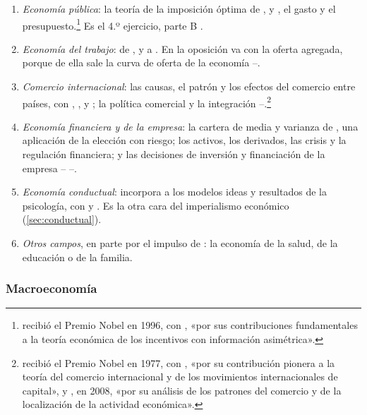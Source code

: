 \documentclass[11pt]{article}
\begin{document}
\begin{itemize}
\begin{enumerate}
  \item \emph{Economía pública}: la teoría de la imposición óptima de ,  y , el gasto y el presupuesto.\footnote{ recibió el Premio Nobel en 1996, con , «por sus contribuciones fundamentales a la teoría económica de los incentivos con información asimétrica»\nocite{Nobel1996MirrleesVickrey}.} Es el 4.º ejercicio, parte B .
  \item \emph{Economía del trabajo}: de ,  y  a . En la oposición va con la oferta agregada, porque de ella sale la curva de oferta de la economía --.
  \item \emph{Comercio internacional}: las causas, el patrón y los efectos del comercio entre países, con , ,  y ; la política comercial y la integración --.\footnote{ recibió el Premio Nobel en 1977, con , «por su contribución pionera a la teoría del comercio internacional y de los movimientos internacionales de capital»\nocite{Nobel1977MeadeOhlin}, y , en 2008, «por su análisis de los patrones del comercio y de la localización de la actividad económica»\nocite{Nobel2008Krugman}.}
  \item \emph{Economía financiera y de la empresa}: la cartera de media y varianza de , una aplicación de la elección con riesgo; los activos, los derivados, las crisis y la regulación financiera; y las decisiones de inversión y financiación de la empresa -- --.
  \item \emph{Economía conductual}: incorpora a los modelos ideas y resultados de la psicología, con  y . Es la otra cara del imperialismo económico (\ref{sec:conductual}).
  \item \emph{Otros campos}, en parte por el impulso de : la economía de la salud, de la educación o de la familia.
  \end{enumerate}
\end{itemize}

\subsubsection{Macroeconomía}\label{sec:macro}
\end{document}
